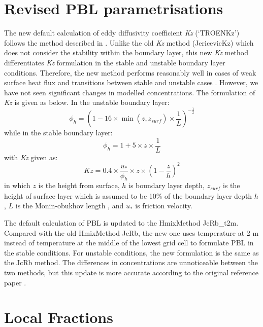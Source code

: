 \section{Revised PBL parametrisations}
\label{sec:updateKz}

The new default calculation of eddy diffusivity coefficient \textit{Kz} (`TROENKz') follows the method described in \citet{troenkz}. Unlike the old \textit{Kz} method (JericevicKz) which does not consider the stability within the boundary layer, this new \textit{Kz} method differentiates \textit{Kz} formulation in the stable and unstable boundary layer conditions. Therefore, the new method performs reasonably well in cases of weak surface heat flux and transitions between stable and unstable cases \citep{troenkz}. However, we have not seen significant changes in modelled concentrations. The formulation of \textit{Kz} is given as below. In the unstable boundary layer:
\begin{equation}
    \phi_h = (1 - 16 \times \min(z, z_\mathit{surf}) \times \frac{1}{L})^{-\frac 1 2}
\end{equation}
while in the stable boundary layer:
\begin{equation}
    \phi_h = 1 + 5 \times z \times \frac{1}{L}
\end{equation}
with \textit{Kz} given as: 
\begin{equation}
    \mathit{Kz} = 0.4 \times \frac{u_*}{\phi_h} \times z \times (1 - \frac z h)^2
\end{equation}
in which $z$ is the height from surface, $h$ is boundary layer depth, $z_\mathit{surf}$ is the height of surface layer which is assumed to be 10\% of the boundary layer depth $h$,  $L$ is the Monin-obukhov length \citep{Garratt}, and $u_*$ is friction velocity.

The default calculation of PBL is updated to the HmixMethod JcRb\_t2m. Compared with the old HmixMethod JcRb, the new one uses temperature at 2 m instead of temperature at the middle of the lowest grid cell to formulate PBL in the stable conditions. For unstable conditions, the new formulation is the same as the JcRb method. The differences in concentrations are unnoticeable between the two methods, but this update is more accurate according to the original reference paper \citep{JcRb}.  


\section{Local Fractions}
\label{sec:updateLF}

